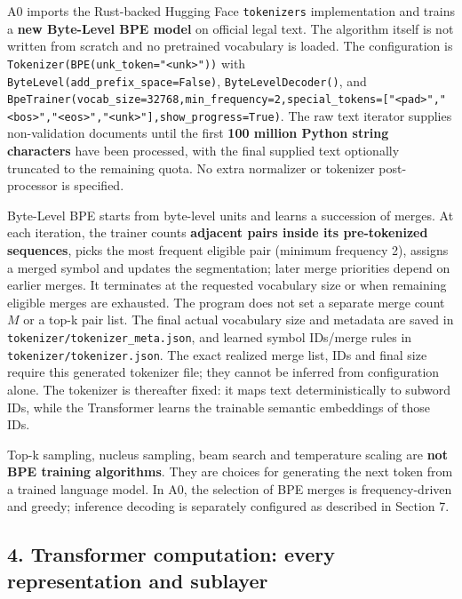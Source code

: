 A0 imports the Rust-backed Hugging Face \texttt{tokenizers}
implementation and trains a \textbf{new Byte-Level BPE model} on
official legal text. The algorithm itself is not written from scratch
and no pretrained vocabulary is loaded. The configuration is
\texttt{Tokenizer(BPE(unk\_token="\textless{}unk\textgreater{}"))} with
\texttt{ByteLevel(add\_prefix\_space=False)},
\texttt{ByteLevelDecoder()}, and
\texttt{BpeTrainer(vocab\_size=32768,min\_frequency=2,special\_tokens={[}"\textless{}pad\textgreater{}","\textless{}bos\textgreater{}","\textless{}eos\textgreater{}","\textless{}unk\textgreater{}"{]},show\_progress=True)}.
The raw text iterator supplies non-validation documents until the first
\textbf{100 million Python string characters} have been processed, with
the final supplied text optionally truncated to the remaining quota. No
extra normalizer or tokenizer post-processor is specified.

Byte-Level BPE starts from byte-level units and learns a succession of
merges. At each iteration, the trainer counts \textbf{adjacent pairs
inside its pre-tokenized sequences}, picks the most frequent eligible
pair (minimum frequency 2), assigns a merged symbol and updates the
segmentation; later merge priorities depend on earlier merges. It
terminates at the requested vocabulary size or when remaining eligible
merges are exhausted. The program does not set a separate merge count
\(M\) or a top-k pair list. The final actual vocabulary size and
metadata are saved in \texttt{tokenizer/tokenizer\_meta.json}, and
learned symbol IDs/merge rules in \texttt{tokenizer/tokenizer.json}. The
exact realized merge list, IDs and final size require this generated
tokenizer file; they cannot be inferred from configuration alone. The
tokenizer is thereafter fixed: it maps text deterministically to subword
IDs, while the Transformer learns the trainable semantic embeddings of
those IDs.

Top-k sampling, nucleus sampling, beam search and temperature scaling
are \textbf{not BPE training algorithms}. They are choices for
generating the next token from a trained language model. In A0, the
selection of BPE merges is frequency-driven and greedy; inference
decoding is separately configured as described in Section 7.

\subsection{4. Transformer computation: every representation and
sublayer}\label{transformer-computation-every-representation-and-sublayer}

